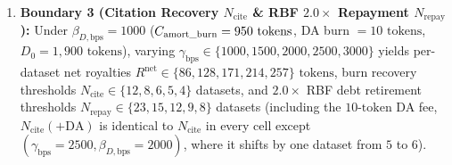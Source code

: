 \documentclass[runningheads,a4paper]{llncs}
\renewcommand{\_}{\textunderscore\allowbreak}
\begin{document}
\begin{enumerate}
  \item \textbf{Boundary 3 (Citation Recovery $N_{\text{cite}}$ \& RBF $2.0\times$ Repayment $N_{\text{repay}}$):} Under $\beta_{D,\text{bps}} = 1000$ ($C_{\text{amort\_burn}} = 950\text{ tokens}$, DA burn $= 10\text{ tokens}$, $D_0 = 1,900\text{ tokens}$), varying $\gamma_{\text{bps}} \in \{1000,\allowbreak 1500,\allowbreak 2000,\allowbreak 2500,\allowbreak 3000\}$ yields per-dataset net royalties $R^{\text{net}} \in \{86,\allowbreak 128,\allowbreak 171,\allowbreak 214,\allowbreak 257\}\text{ tokens}$, burn recovery thresholds $N_{\text{cite}} \in \{12,\allowbreak 8,\allowbreak 6,\allowbreak 5,\allowbreak 4\}$ datasets, and $2.0\times$ RBF debt retirement thresholds $N_{\text{repay}} \in \{23,\allowbreak 15,\allowbreak 12,\allowbreak 9,\allowbreak 8\}$ datasets (including the $10\text{-token}$ DA fee, $N_{\text{cite}}(+\text{DA})$ is identical to $N_{\text{cite}}$ in every cell except $(\gamma_{\text{bps}} = 2500,\allowbreak \beta_{D,\text{bps}} = 2000)$, where it shifts by one dataset from $5$ to $6$).
\end{enumerate}
\end{document}
